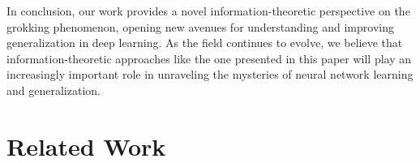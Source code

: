 \documentclass{article} %
\begin{document}
In conclusion, our work provides a novel information-theoretic perspective on the grokking phenomenon, opening new avenues for understanding and improving generalization in deep learning. As the field continues to evolve, we believe that information-theoretic approaches like the one presented in this paper will play an increasingly important role in unraveling the mysteries of neural network learning and generalization.

\section{Related Work}
\label{sec:related}





\end{document}
